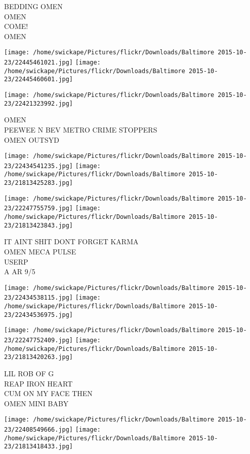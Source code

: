 \documentclass[10pt,letterpaper]{article}
\begin{document}
BEDDING OMEN\\
OMEN\\
COME!\\
OMEN
\pagebreak

\texttt{[image: /home/swickape/Pictures/flickr/Downloads/Baltimore 2015-10-23/22445461021.jpg]}
\texttt{[image: /home/swickape/Pictures/flickr/Downloads/Baltimore 2015-10-23/22445460601.jpg]}

\vspace{0.25in}
\texttt{[image: /home/swickape/Pictures/flickr/Downloads/Baltimore 2015-10-23/22421323992.jpg]}

OMEN\\
PEEWEE N BEV METRO CRIME STOPPERS\\
OMEN OUTSYD
\pagebreak

\texttt{[image: /home/swickape/Pictures/flickr/Downloads/Baltimore 2015-10-23/22434541235.jpg]}
\texttt{[image: /home/swickape/Pictures/flickr/Downloads/Baltimore 2015-10-23/21813425283.jpg]}

\texttt{[image: /home/swickape/Pictures/flickr/Downloads/Baltimore 2015-10-23/22247755759.jpg]}
\texttt{[image: /home/swickape/Pictures/flickr/Downloads/Baltimore 2015-10-23/21813423843.jpg]}

IT AINT SHIT DONT FORGET KARMA\\
OMEN MECA PULSE\\
USERP\\
A AR 9/5
\pagebreak

\texttt{[image: /home/swickape/Pictures/flickr/Downloads/Baltimore 2015-10-23/22434538115.jpg]}
\texttt{[image: /home/swickape/Pictures/flickr/Downloads/Baltimore 2015-10-23/22434536975.jpg]}

\texttt{[image: /home/swickape/Pictures/flickr/Downloads/Baltimore 2015-10-23/22247752409.jpg]}
\texttt{[image: /home/swickape/Pictures/flickr/Downloads/Baltimore 2015-10-23/21813420263.jpg]}

LIL ROB OF G\\
REAP IRON HEART\\
CUM ON MY FACE THEN\\
OMEN MINI BABY
\pagebreak

\texttt{[image: /home/swickape/Pictures/flickr/Downloads/Baltimore 2015-10-23/22408549666.jpg]}
\texttt{[image: /home/swickape/Pictures/flickr/Downloads/Baltimore 2015-10-23/21813418433.jpg]}
\end{document}
